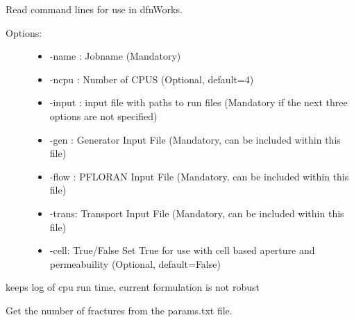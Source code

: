 \documentclass[letterpaper,10pt,english]{sphinxmanual}
\begin{document}
\begin{fulllineitems}
\label{pydfnworks:pydfnworks.helper.commandline_options}
Read command lines for use in dfnWorks.
\begin{description}
\item[{Options:}] \leavevmode\begin{itemize}
\item {} 
-name : Jobname (Mandatory)

\item {} 
-ncpu : Number of CPUS (Optional, default=4)

\item {} 
-input : input file with paths to run files (Mandatory if the next three options are not specified)

\item {} 
-gen : Generator Input File (Mandatory, can be included within this file)

\item {} 
-flow : PFLORAN Input File (Mandatory, can be included within this file)

\item {} 
-trans: Transport Input File (Mandatory, can be included within this file)

\item {} 
-cell: True/False Set True for use with cell based aperture and permeabuility (Optional, default=False)

\end{itemize}

\end{description}

\end{fulllineitems}


\begin{fulllineitems}
\label{pydfnworks:pydfnworks.helper.dump_time}
keeps log of cpu run time, current formulation is not robust

\end{fulllineitems}


\begin{fulllineitems}
\label{pydfnworks:pydfnworks.helper.get_num_frac}
Get the number of fractures from the params.txt file.

\end{fulllineitems}
\end{document}
